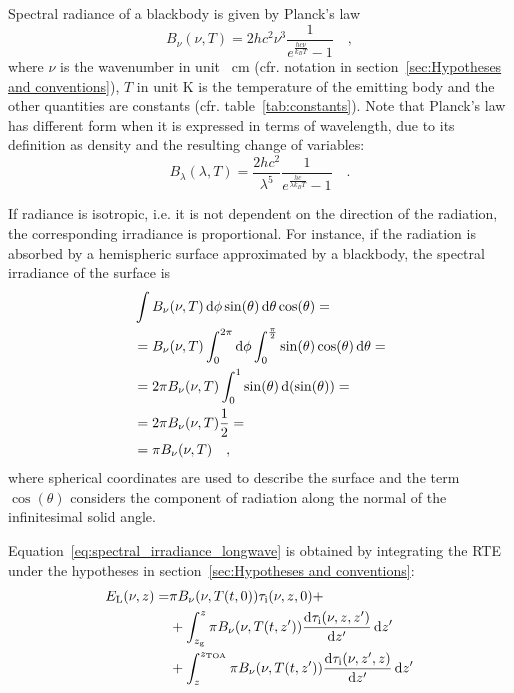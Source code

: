 \documentclass[a4paper,10pt,twocolumn,\classoptions]{article}
\newcommand{\zTOA}{z_\text{TOA}}
\begin{document}
Spectral radiance of a blackbody is given by Planck's law
\begin{equation}
  \label{eq:spectral_radiance_blackbody}
  B_\nu (\nu, T) = 2 h c^2 \nu^3 \frac{1}{e^\frac{h c \nu}{k_B T} - 1}
  \quad ,
\end{equation}
where $\nu$ is the wavenumber in unit \unit{\per\centi\metre} (cfr. notation in section~\ref{sec:Hypotheses and conventions}), $T$ in unit \unit{\kelvin} is the temperature of the emitting body and the other quantities are constants (cfr. table~\ref{tab:constants}).
Note that Planck's law has different form when it is expressed in terms of wavelength, due to its definition as density and the resulting change of variables:
\begin{equation}
  \label{eq:spectral_radiance_blackbody_lambda}
  B_\lambda (\lambda, T) = \frac{2 h c^2}{\lambda^5} \frac{1}{e^\frac{h c}{\lambda k_B T} - 1}
  \quad .
\end{equation}

If radiance is isotropic, i.e. it is not dependent on the direction of the radiation, the corresponding irradiance is proportional. For instance, if the radiation is absorbed by a hemispheric surface approximated by a blackbody, the spectral irradiance of the surface is
\begin{equation}
  \label{eq:spectral_irradiance_blackbody_hemisphere}
  \begin{split}
    & \int B_\nu (\nu, T) \odif{\phi} \sin(\theta) \odif{\theta} \cos(\theta) = \\
    & = B_\nu (\nu, T) \int_0^{2\pi} \odif{\phi} \int_0^\frac{\pi}{2} \sin(\theta) \cos(\theta) \odif{\theta} = \\
    & = 2 \pi B_\nu (\nu, T) \int_0^1 \sin(\theta) \odif{(\sin(\theta))} = \\
    & = 2 \pi B_\nu (\nu, T) \frac{1}{2} = \\
    & = \pi B_\nu (\nu, T)
    \quad ,
  \end{split}
\end{equation}
where spherical coordinates are used to describe the surface and the term $\cos(\theta)$ considers the component of radiation along the normal of the infinitesimal solid angle.

Equation~\eqref{eq:spectral_irradiance_longwave} is obtained by integrating the RTE under the hypotheses in section~\ref{sec:Hypotheses and conventions}:
\begin{equation}
  \label{eq:spectral_irradiance_longwave_derivation}
  \begin{split}
    E_\text{L}(\nu, z) = & \pi B_\nu(\nu, T(t, 0)) \tau_\text{i}(\nu, z, 0) + \\
    & + \int_{z_\text{g}}^{z} \pi B_\nu(\nu, T(t, z')) \odv{\tau_\text{i}(\nu, z, z')}{z'} \odif{z'} \\
    & + \int_{z}^{\zTOA} \pi B_\nu(\nu, T(t, z')) \odv{\tau_\text{i}(\nu, z', z)}{z'} \odif{z'}
  \end{split}
\end{equation}
\end{document}
